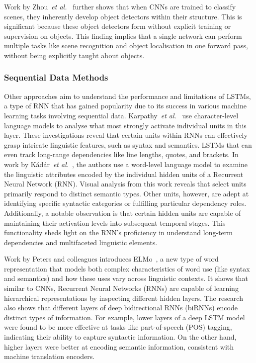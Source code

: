 Work by Zhou~\textit{et al.}~\cite{ZhouKLOT14} further shows that when CNNs are trained to classify scenes, they inherently develop object detectors within their structure. This is significant because these object detectors form without explicit training or supervision on objects. This finding implies that a single network can perform multiple tasks like scene recognition and object localisation in one forward pass, without being explicitly taught about objects.

\subsubsection{Sequential Data Methods}

Other approaches aim to understand the performance and limitations of LSTMs, a type of RNN that has gained popularity due to its success in various machine learning tasks involving sequential data. Karpathy~\textit{et al.}~\cite{KarpathyJL15} use character-level language models to analyse what most strongly activate individual units in this layer. These investigations reveal that certain units within RNNs can effectively grasp intricate linguistic features, such as syntax and semantics. LSTMs that can even track long-range dependencies like line lengths, quotes, and brackets. In work by Kádár~\textit{et al.}~\cite{KadarCA17}, the authors use a word-level language model to examine the linguistic attributes encoded by the individual hidden units of a Recurrent Neural Network (RNN). Visual analysis from this work reveals that select units primarily respond to distinct semantic types. Other units, however, are adept at identifying specific syntactic categories or fulfilling particular dependency roles. Additionally, a notable observation is that certain hidden units are capable of maintaining their activation levels into subsequent temporal stages. This functionality sheds light on the RNN's proficiency in understand long-term dependencies and multifaceted linguistic elements. 

Work by Peters and colleagues introduces ELMo~\cite{PetersNIGCLZ18}, a new type of word representation that models both complex characteristics of word use (like syntax and semantics) and how these uses vary across linguistic contexts. It shows that similar to CNNs, Recurrent Neural Networks (RNNs) are capable of learning hierarchical representations by inspecting different hidden layers. The research also shows that different layers of deep bidirectional RNNs (biRNNs) encode distinct types of information. For example, lower layers of a deep LSTM model were found to be more effective at tasks like part-of-speech (POS) tagging, indicating their ability to capture syntactic information. On the other hand, higher layers were better at encoding semantic information, consistent with machine translation encoders.


